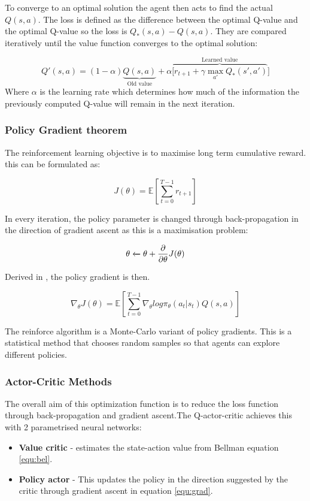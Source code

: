 To converge to an optimal solution the agent then acts to find the actual $Q(s,a)$. The loss is defined as the difference between the optimal Q-value and the optimal Q-value so the loss is $Q_*(s,a)-Q(s,a)$. They are compared iteratively until the value function converges to the optimal solution:

\begin{equation}
    Q'(s,a) = (1-\alpha)\underbrace{Q(s,a)}_\text{Old value} + \alpha\overbrace{[r_{t+1} + \gamma\mathop{max}_{a'}Q_*(s',a')}^\text{Learned value} ]
\end{equation}
Where $\alpha$ is the learning rate which determines how much of the information the previously computed Q-value will remain in the next iteration.


\clearpage
\subsubsection{Policy Gradient theorem}\label{GOAL}
The reinforcement learning objective is to maximise long term cumulative reward. this can be formulated as:

\begin{equation}
    J(\theta) = \mathbb{E}[\sum_{t=0}^{T-1} r_{t+1}]
    \label{equ:re}
\end{equation}

In every iteration, the policy parameter is changed through back-propagation in the direction of gradient ascent as this is a maximisation problem:

\[\theta \xleftarrow{} \theta + {\partial\over{\partial\theta}}J(\theta)\]


\noindent
Derived in \cite{neu2}, the policy gradient is then.

\begin{equation}
    \nabla_\theta J(\theta) = \mathbb{E}[\sum_{t=0}^{T-1} \nabla_\theta log\pi_\theta (a_t|s_t)Q(s,a)]
    \label{equ:grad}
\end{equation}

\noindent
The reinforce algorithm is a Monte-Carlo\cite{mon1} variant of policy gradients. This is a statistical method that chooses random samples so that agents can explore different policies.





\subsubsection{Actor-Critic Methods}
The overall aim of this optimization function is to reduce the loss function through back-propagation and gradient ascent\cite{ac1}.The Q-actor-critic achieves this with 2 parametrised neural networks:

\begin{itemize}
    \item 
    \textbf{Value critic} -
    estimates the state-action value from Bellman equation \ref{equ:bel}.
    \item 
    \textbf{Policy actor} -
    This updates the policy in the direction suggested by the critic through gradient ascent in equation \ref{equ:grad}.
\end{itemize}


\clearpage